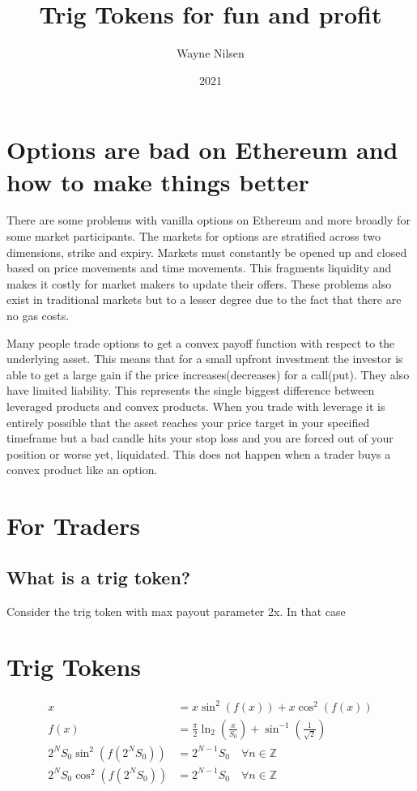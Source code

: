 \documentclass[12pt]{article}
\title{Trig Tokens for fun and profit}
\author{Wayne Nilsen}
\date{2021}
\begin{document}
    \maketitle


    \section{Options are bad on Ethereum and how to make things better}

    There are some problems with vanilla options on Ethereum and more broadly for some market participants. The markets for options are stratified across two dimensions, strike and expiry. Markets must constantly be opened up and closed based on price movements and time movements. This fragments liquidity and makes it costly for market makers to update their offers. These problems also exist in traditional markets but to a lesser degree due to the fact that there are no gas costs.

    Many people trade options to get a convex payoff function with respect to the underlying asset. This means that for a small upfront investment the investor is able to get a large gain if the price increases(decreases) for a call(put). They also have limited liability. This represents the single biggest difference between leveraged products and convex products. When you trade with leverage it is entirely possible that the asset reaches your price target in your specified timeframe but a bad candle hits your stop loss and you are forced out of your position or worse yet, liquidated. This does not happen when a trader buys a convex product like an option.


    \section{For Traders}

    \subsection{What is a trig token?}

    Consider the trig token with max payout parameter 2x. In that case

    \section{Trig Tokens}

    \begin{align*}
        x &= x \sin^2(f(x)) + x \cos^2(f(x)) \\
        f(x) &= \frac{\pi}{2}\ln_2\left(\frac{x}{S_0}\right) + \sin^{-1}\left(\frac{1}{\sqrt{2}} \right) \\
        2^N S_0 \sin^2(f(2^N S_0)) &= 2^{N-1} S_0 \quad \forall n \in \mathbb{Z} \\
        2^N S_0 \cos^2(f(2^N S_0)) &= 2^{N-1} S_0 \quad \forall n \in \mathbb{Z}
    \end{align*}
\end{document}
